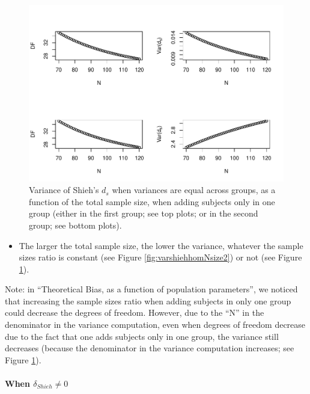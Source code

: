 \documentclass[
  man]{apa6}
\providecommand{\tightlist}{%
  \setlength{\itemsep}{0pt}\setlength{\parskip}{0pt}}
\begin{document}
\begin{figure}
\centering
\includegraphics{Theoretical-Variance-of-all-estimators-as-a-function-of-population-parameters_files/figure-latex/varshiehhomNsize4-1.pdf}
\caption{\label{fig:varshiehhomNsize4}Variance of Shieh's \(d_s\) when variances are equal across groups, as a function of the total sample size, when adding subjects only in one group (either in the first group; see top plots; or in the second group; see bottom plots).}
\end{figure}

\begin{itemize}
\tightlist
\item
  The larger the total sample size, the lower the variance, whatever the sample sizes ratio is constant (see Figure \ref{fig:varshiehhomNsize2}) or not (see Figure \ref{fig:varshiehhomNsize4}).
\end{itemize}

Note: in \enquote{Theoretical Bias, as a function of population parameters}, we noticed that increasing the sample sizes ratio when adding subjects in only one group could decrease the degrees of freedom. However, due to the \enquote{N} in the denominator in the variance computation, even when degrees of freedom decrease due to the fact that one adds subjects only in one group, the variance still decreases (because the denominator in the variance computation increases; see Figure \ref{fig:varshiehhomNsize4}).

\hypertarget{when-delta_shieh-neq-0}{%
\paragraph{\texorpdfstring{When \(\delta_{Shieh} \neq 0\)}{When \textbackslash delta\_\{Shieh\} \textbackslash neq 0}}\label{when-delta_shieh-neq-0}}
\end{document}

